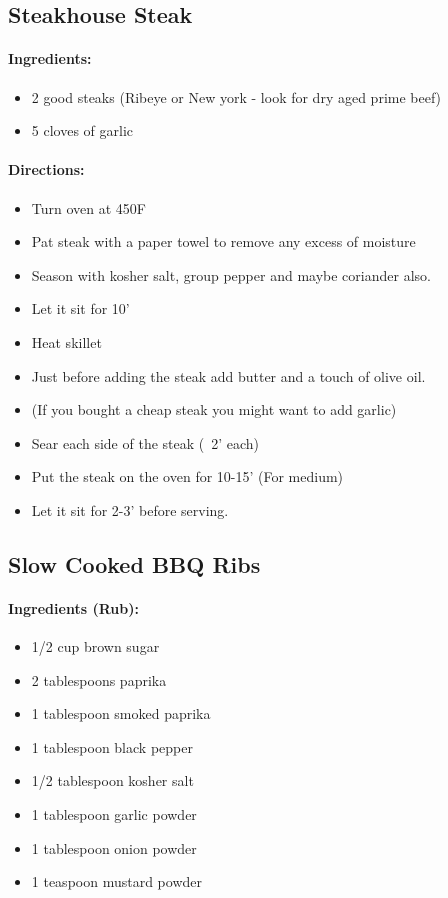 \documentclass{article}
\begin{document}
\subsection{Steakhouse Steak}

\paragraph{Ingredients:}
\begin{itemize}
    \item 2 good steaks (Ribeye or New york - look for dry aged prime beef)
    \item 5 cloves of garlic
\end{itemize}

\paragraph{Directions:}
\begin{itemize}
    \item Turn oven at 450F
    \item Pat steak with a paper towel to remove any excess of moisture
    \item Season with kosher salt, group pepper and maybe coriander also.
    \item Let it sit for 10'
    \item Heat skillet
    \item Just before adding the steak add butter and a touch of olive oil.
    \item (If you bought a cheap steak you might want to add garlic)
    \item Sear each side of the steak (~2' each)
    \item Put the steak on the oven for 10-15' (For medium)
    \item Let it sit for 2-3' before serving.
\end{itemize}

\subsection{Slow Cooked BBQ Ribs} 

\paragraph{Ingredients (Rub):}
\begin{itemize}
    \item 1/2 cup brown sugar
    \item 2 tablespoons paprika
    \item 1 tablespoon smoked paprika
    \item 1 tablespoon black pepper
    \item 1/2 tablespoon kosher salt
    \item 1 tablespoon garlic powder
    \item 1 tablespoon onion powder
    \item 1 teaspoon mustard powder
\end{itemize}  
\end{document}
